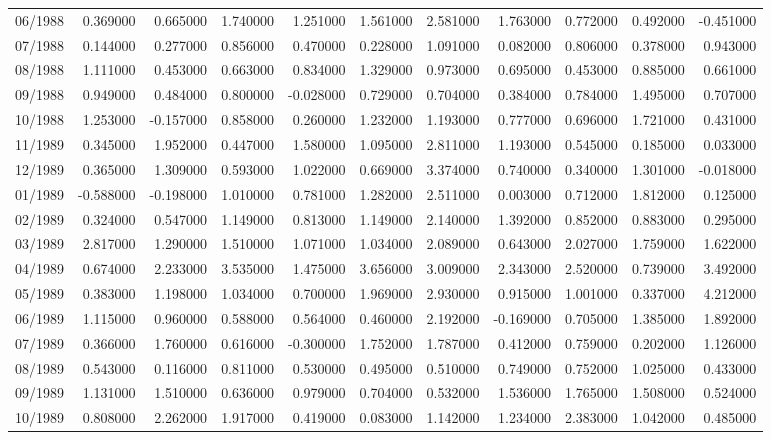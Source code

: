 \begin{tabular}{lrrrrrrrrrr}
06/1988 & 0.369000 & 0.665000 & 1.740000 & 1.251000 & 1.561000 & 2.581000 & 1.763000 & 0.772000 & 0.492000 & -0.451000 \\
07/1988 & 0.144000 & 0.277000 & 0.856000 & 0.470000 & 0.228000 & 1.091000 & 0.082000 & 0.806000 & 0.378000 & 0.943000 \\
08/1988 & 1.111000 & 0.453000 & 0.663000 & 0.834000 & 1.329000 & 0.973000 & 0.695000 & 0.453000 & 0.885000 & 0.661000 \\
09/1988 & 0.949000 & 0.484000 & 0.800000 & -0.028000 & 0.729000 & 0.704000 & 0.384000 & 0.784000 & 1.495000 & 0.707000 \\
10/1988 & 1.253000 & -0.157000 & 0.858000 & 0.260000 & 1.232000 & 1.193000 & 0.777000 & 0.696000 & 1.721000 & 0.431000 \\
11/1989 & 0.345000 & 1.952000 & 0.447000 & 1.580000 & 1.095000 & 2.811000 & 1.193000 & 0.545000 & 0.185000 & 0.033000 \\
12/1989 & 0.365000 & 1.309000 & 0.593000 & 1.022000 & 0.669000 & 3.374000 & 0.740000 & 0.340000 & 1.301000 & -0.018000 \\
01/1989 & -0.588000 & -0.198000 & 1.010000 & 0.781000 & 1.282000 & 2.511000 & 0.003000 & 0.712000 & 1.812000 & 0.125000 \\
02/1989 & 0.324000 & 0.547000 & 1.149000 & 0.813000 & 1.149000 & 2.140000 & 1.392000 & 0.852000 & 0.883000 & 0.295000 \\
03/1989 & 2.817000 & 1.290000 & 1.510000 & 1.071000 & 1.034000 & 2.089000 & 0.643000 & 2.027000 & 1.759000 & 1.622000 \\
04/1989 & 0.674000 & 2.233000 & 3.535000 & 1.475000 & 3.656000 & 3.009000 & 2.343000 & 2.520000 & 0.739000 & 3.492000 \\
05/1989 & 0.383000 & 1.198000 & 1.034000 & 0.700000 & 1.969000 & 2.930000 & 0.915000 & 1.001000 & 0.337000 & 4.212000 \\
06/1989 & 1.115000 & 0.960000 & 0.588000 & 0.564000 & 0.460000 & 2.192000 & -0.169000 & 0.705000 & 1.385000 & 1.892000 \\
07/1989 & 0.366000 & 1.760000 & 0.616000 & -0.300000 & 1.752000 & 1.787000 & 0.412000 & 0.759000 & 0.202000 & 1.126000 \\
08/1989 & 0.543000 & 0.116000 & 0.811000 & 0.530000 & 0.495000 & 0.510000 & 0.749000 & 0.752000 & 1.025000 & 0.433000 \\
09/1989 & 1.131000 & 1.510000 & 0.636000 & 0.979000 & 0.704000 & 0.532000 & 1.536000 & 1.765000 & 1.508000 & 0.524000 \\
10/1989 & 0.808000 & 2.262000 & 1.917000 & 0.419000 & 0.083000 & 1.142000 & 1.234000 & 2.383000 & 1.042000 & 0.485000 \\

\end{tabular}
